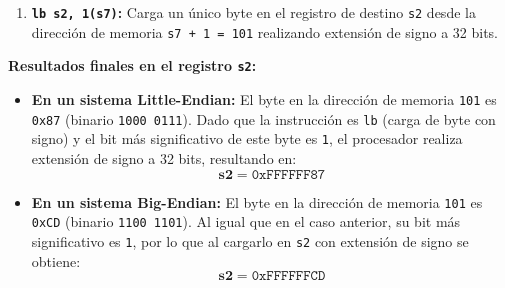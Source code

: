 \documentclass[letterpaper,12pt]{article}
\begin{document}
\begin{enumerate}
\begin{enumerate}[label=\arabic*)]
        \item \textbf{\texttt{lb s2, 1(s7)}:} Carga un único byte en el registro de destino \texttt{s2} desde la dirección de memoria \texttt{s7 + 1 = 101} realizando extensión de signo a 32 bits.
    \end{enumerate}

    \textbf{Resultados finales en el registro \texttt{s2}:}
    \begin{itemize}
        \item \textbf{En un sistema Little-Endian:}
        El byte en la dirección de memoria \texttt{101} es \texttt{0x87} (binario \texttt{1000 0111}). Dado que la instrucción es \texttt{lb} (carga de byte con signo) y el bit más significativo de este byte es \texttt{1}, el procesador realiza extensión de signo a 32 bits, resultando en:
        $$\mathbf{s2 = \mathtt{0xFFFFFF87}}$$
        
        \item \textbf{En un sistema Big-Endian:}
        El byte en la dirección de memoria \texttt{101} es \texttt{0xCD} (binario \texttt{1100 1101}). Al igual que en el caso anterior, su bit más significativo es \texttt{1}, por lo que al cargarlo en \texttt{s2} con extensión de signo se obtiene:
        $$\mathbf{s2 = \mathtt{0xFFFFFFCD}}$$
    \end{itemize}
    \color{black}

\end{enumerate}
\end{document}
